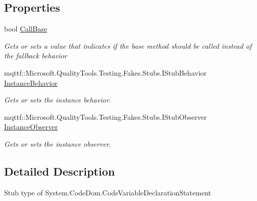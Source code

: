\subsection*{Properties}
\begin{DoxyCompactItemize}
\item 
bool \hyperlink{class_system_1_1_code_dom_1_1_fakes_1_1_stub_code_variable_declaration_statement_a4cec043db7ec43a0614c5aea0d1d54b6}{Call\-Base}
\begin{DoxyCompactList}\small\item\em Gets or sets a value that indicates if the base method should be called instead of the fallback behavior\end{DoxyCompactList}\item 
mqttf\-::\-Microsoft.\-Quality\-Tools.\-Testing.\-Fakes.\-Stubs.\-I\-Stub\-Behavior \hyperlink{class_system_1_1_code_dom_1_1_fakes_1_1_stub_code_variable_declaration_statement_a0abb4546ceefab701d51fa9f9bc96b4d}{Instance\-Behavior}
\begin{DoxyCompactList}\small\item\em Gets or sets the instance behavior.\end{DoxyCompactList}\item 
mqttf\-::\-Microsoft.\-Quality\-Tools.\-Testing.\-Fakes.\-Stubs.\-I\-Stub\-Observer \hyperlink{class_system_1_1_code_dom_1_1_fakes_1_1_stub_code_variable_declaration_statement_a6de08cbd7772c8cd33333b48bb1e488b}{Instance\-Observer}
\begin{DoxyCompactList}\small\item\em Gets or sets the instance observer.\end{DoxyCompactList}\end{DoxyCompactItemize}


\subsection{Detailed Description}
Stub type of System.\-Code\-Dom.\-Code\-Variable\-Declaration\-Statement



